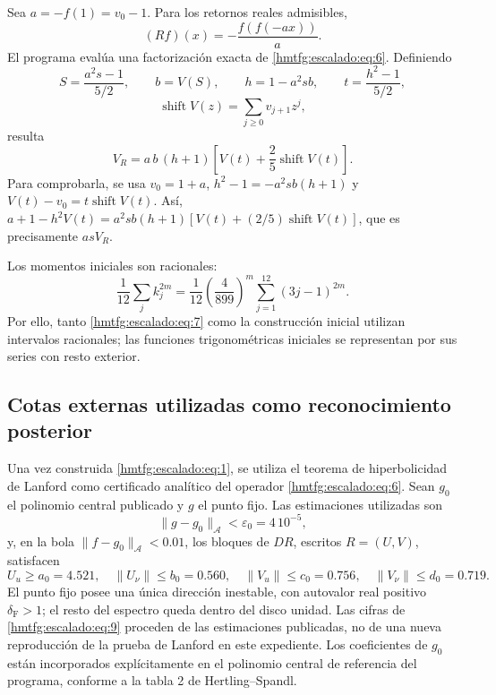 Sea \(a=-f(1)=v_0-1\). Para los retornos reales admisibles,
\begin{equation}
(Rf)(x)=-\frac{f(f(-ax))}{a}.
\label{hmtfg:escalado:eq:6}
\end{equation}
El programa evalúa una factorización exacta de \eqref{hmtfg:escalado:eq:6}. Definiendo
\[
S=\frac{a^2s-1}{5/2},\qquad b=V(S),\qquad
h=1-a^2sb,\qquad t=\frac{h^2-1}{5/2},
\]
\[
\operatorname{shift}V(z)=\sum_{j\ge0}v_{j+1}z^j,
\]
resulta
\begin{equation}
\boxed{V_R=a\,b\,(h+1)\left[V(t)+\frac25\operatorname{shift}V(t)\right].}
\label{hmtfg:escalado:eq:7}
\end{equation}
Para comprobarla, se usa \(v_0=1+a\),
\(h^2-1=-a^2sb(h+1)\) y
\(V(t)-v_0=t\operatorname{shift}V(t)\). Así,
\(a+1-h^2V(t)=a^2sb(h+1)[V(t)+(2/5)\operatorname{shift}V(t)]\),
que es precisamente \(asV_R\).

Los momentos iniciales son racionales:
\begin{equation}
\frac1{12}\sum_jk_j^{2m}
=\frac1{12}\left(\frac4{899}\right)^m
\sum_{j=1}^{12}(3j-1)^{2m}.
\label{hmtfg:escalado:eq:8}
\end{equation}
Por ello, tanto \eqref{hmtfg:escalado:eq:7} como la construcción inicial utilizan intervalos racionales; las funciones trigonométricas iniciales se representan por sus series con resto exterior.


\subsection{Cotas externas utilizadas como reconocimiento posterior}
\label{hmtfg:escalado:3}

Una vez construida \eqref{hmtfg:escalado:eq:1}, se utiliza el teorema de hiperbolicidad de Lanford como certificado analítico del operador \eqref{hmtfg:escalado:eq:6}. Sean \(g_0\) el polinomio central publicado y \(g\) el punto fijo. Las estimaciones utilizadas son
\[
\|g-g_0\|_{\mathcal A}<\varepsilon_0=4\,10^{-5},
\]
y, en la bola \(\|f-g_0\|_{\mathcal A}<0.01\), los bloques de \(DR\), escritos \(R=(U,V)\), satisfacen
\begin{equation}
U_u\ge a_0=4.521,\quad
\|U_\nu\|\le b_0=0.560,\quad
\|V_u\|\le c_0=0.756,\quad
\|V_\nu\|\le d_0=0.719.
\label{hmtfg:escalado:eq:9}
\end{equation}
El punto fijo posee una única dirección inestable, con autovalor real positivo \(\delta_{\mathrm F}>1\); el resto del espectro queda dentro del disco unidad. Las cifras de \eqref{hmtfg:escalado:eq:9} proceden de las estimaciones publicadas, no de una nueva reproducción de la prueba de Lanford en este expediente. Los coeficientes de \(g_0\) están incorporados explícitamente en el polinomio central de referencia del programa, conforme a la tabla 2 de Hertling–Spandl.

